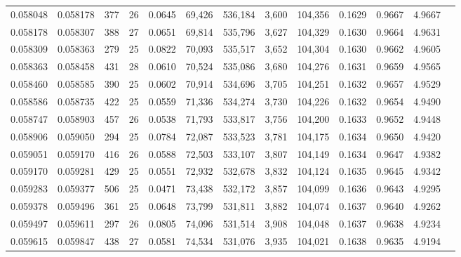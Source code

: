 \begin{tabular}{rrrrrrrrrrrrr}
0.058048 & 0.058178 & 377 &  26 &                                     0.0645 &  69,426 & 536,184 &   3,600 & 104,356 & 0.1629 & 0.9667 & 4.9667 \\
0.058178 & 0.058307 & 388 &  27 &                                     0.0651 &  69,814 & 535,796 &   3,627 & 104,329 & 0.1630 & 0.9664 & 4.9631 \\
0.058309 & 0.058363 & 279 &  25 &                                     0.0822 &  70,093 & 535,517 &   3,652 & 104,304 & 0.1630 & 0.9662 & 4.9605 \\
0.058363 & 0.058458 & 431 &  28 &                                     0.0610 &  70,524 & 535,086 &   3,680 & 104,276 & 0.1631 & 0.9659 & 4.9565 \\
0.058460 & 0.058585 & 390 &  25 &                                     0.0602 &  70,914 & 534,696 &   3,705 & 104,251 & 0.1632 & 0.9657 & 4.9529 \\
0.058586 & 0.058735 & 422 &  25 &                                     0.0559 &  71,336 & 534,274 &   3,730 & 104,226 & 0.1632 & 0.9654 & 4.9490 \\
0.058747 & 0.058903 & 457 &  26 &                                     0.0538 &  71,793 & 533,817 &   3,756 & 104,200 & 0.1633 & 0.9652 & 4.9448 \\
0.058906 & 0.059050 & 294 &  25 &                                     0.0784 &  72,087 & 533,523 &   3,781 & 104,175 & 0.1634 & 0.9650 & 4.9420 \\
0.059051 & 0.059170 & 416 &  26 &                                     0.0588 &  72,503 & 533,107 &   3,807 & 104,149 & 0.1634 & 0.9647 & 4.9382 \\
0.059170 & 0.059281 & 429 &  25 &                                     0.0551 &  72,932 & 532,678 &   3,832 & 104,124 & 0.1635 & 0.9645 & 4.9342 \\
0.059283 & 0.059377 & 506 &  25 &                                     0.0471 &  73,438 & 532,172 &   3,857 & 104,099 & 0.1636 & 0.9643 & 4.9295 \\
0.059378 & 0.059496 & 361 &  25 &                                     0.0648 &  73,799 & 531,811 &   3,882 & 104,074 & 0.1637 & 0.9640 & 4.9262 \\
0.059497 & 0.059611 & 297 &  26 &                                     0.0805 &  74,096 & 531,514 &   3,908 & 104,048 & 0.1637 & 0.9638 & 4.9234 \\
0.059615 & 0.059847 & 438 &  27 &                                     0.0581 &  74,534 & 531,076 &   3,935 & 104,021 & 0.1638 & 0.9635 & 4.9194 \\

\end{tabular}
